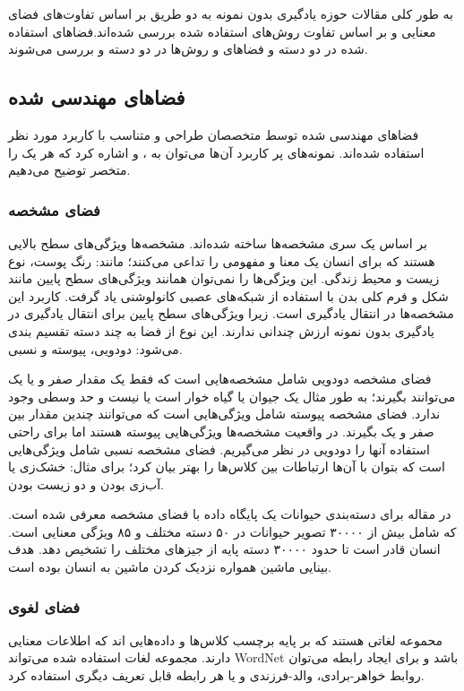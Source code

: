 به طور کلی مقالات حوزه یادگیری بدون نمونه به دو طریق بر اساس تفاوت‌های فضای معنایی و بر اساس تفاوت روش‌های استفاده شده بررسی شده‌اند.فضاهای استفاده شده در دو دسته 
 و 
فضاهای 
و روش‌‌ها در دو دسته 
 و  
بررسی می‌شوند.
\cite{Wang2019}

\subsection{فضاهای مهندسی شده}
فضا‌های مهندسی شده توسط متخصصان طراحی و متناسب با کاربرد مورد نظر استفاده شده‌اند. نمونه‌های پر کاربرد آن‌ها می‌توان به 
، 
 و  
اشاره کرد که هر یک را متخصر توضیح می‌دهیم.
\subsubsection{فضای مشخصه}
بر اساس یک سری مشخصه‌ها ساخته شده‌اند. مشخصه‌ها ویژگی‌های سطح بالایی هستند که برای انسان یک معنا و مفهومی را تداعی می‌کنند؛ مانند: رنگ پوست، نوع زیست و محیط زندگی. این ویژگی‌ها را نمی‌توان همانند ویژگی‌های سطح پایین مانند شکل و فرم کلی بدن با استفاده از شبکه‌های عصبی کانولوشنی یاد گرفت. کاربرد این مشخصه‌ها در انتقال یادگیری است. زیرا ویژگی‌های سطح پایین برای انتقال یادگیری در یادگیری بدون نمونه ارزش چندانی ندارند. این نوع از فضا به چند دسته تقسیم بندی می‌شود: دودویی، پیوسته و نسبی.

فضای مشخصه دودویی شامل مشخصه‌هایی است که فقط یک مقدار صفر و یا یک می‌توانند بگیرند؛ به طور مثال یک جیوان یا گیاه خوار است یا نیست و حد وسطی وجود ندارد. فضای مشخصه پیوسته شامل ویژگی‌هایی است که می‌توانند چندین مقدار بین صفر و یک بگیرند. در واقعیت مشخصه‌ها ویژگی‌هایی پیوسته هستند اما برای راحتی استفاده آنها را دودویی در نظر می‌گیریم. فضای مشخصه نسبی شامل ویژگی‌هایی است که بتوان با آن‌ها ارتباطات بین کلاس‌ها را بهتر بیان کرد؛ برای مثال: خشک‌زی یا آب‌زی بودن و دو زیست بودن.

در مقاله 
\cite{Lampert2014}
برای دسته‌بندی حیوانات یک پایگاه داده با فضای مشخصه 
معرفی شده است. که شامل بیش از ۳۰۰۰۰ تصویر حیوانات در ۵۰ دسته مختلف و ۸۵ ویژگی معنایی است. انسان قادر است تا حدود ۳۰۰۰۰ دسته پایه از جیز‌های مختلف را تشخیص دهد. هدف بینایی ماشین همواره نزدیک کردن ماشین به انسان بوده است. 

\subsubsection{فضای لغوی}
محموعه لغاتی هستند که بر پایه برچسب کلاس‌ها و داده‌هایی اند که اطلاعات معنایی دارند. مجموعه لغات استفاده شده می‌تواند WordNet باشد و برای ایجاد رابطه می‌توان روابط خواهر-برادی، والد-فرزندی و یا هر رابطه‌ قابل تعریف دیگری استفاده کرد.
